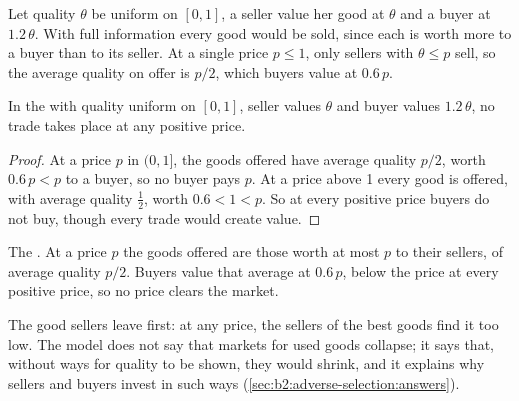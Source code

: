 Let quality $\theta$ be uniform on $[0, 1]$, a seller value her good at $\theta$ and a buyer at $1.2\,\theta$. With full information every
good would be sold, since each is worth more to a buyer than to its seller. At a single price $p \le 1$, only sellers with $\theta \le p$
sell, so the average quality on offer is $p/2$, which buyers value at $0.6\,p$.

\begin{proposition}\label{prop:b2:adverse-selection:collapse}
In the  with quality uniform on $[0, 1]$, seller values $\theta$ and buyer values $1.2\,\theta$, no trade takes place at any
positive price.
\end{proposition}

\begin{proof}
At a price $p$ in $(0, 1]$, the goods offered have average quality $p/2$, worth $0.6\,p < p$ to a buyer, so no buyer pays $p$. At a price above
1 every good is offered, with average quality $\tfrac12$, worth $0.6 < 1 < p$. So at every positive price buyers do not buy, though every
trade would create value.
\end{proof}

\begin{omfigure}

{\small The . At a price $p$ the goods offered are those worth at most $p$ to their sellers, of average quality $p/2$.
Buyers value that average at $0.6\,p$, below the price at every positive price, so no price clears the market.}
\end{omfigure}

The good sellers leave first: at any price, the sellers of the best goods find it too low. The model does not say
that markets for used goods collapse; it says that, without ways for quality to be shown, they would shrink, and it
explains why sellers and buyers invest in such ways (\cref{sec:b2:adverse-selection:answers}).

